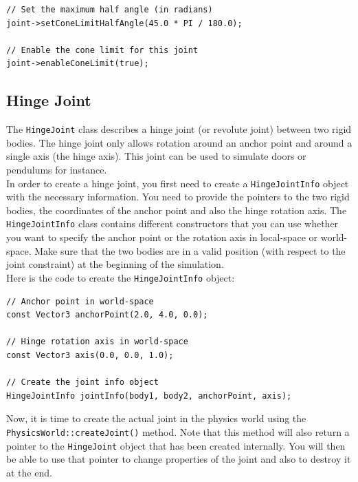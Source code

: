 \documentclass[a4paper,12pt]{article}
\begin{document}
    \begin{lstlisting}
// Set the maximum half angle (in radians) 
joint->setConeLimitHalfAngle(45.0 * PI / 180.0);

// Enable the cone limit for this joint
joint->enableConeLimit(true);
  \end{lstlisting}

    \subsection{Hinge Joint}

    The \texttt{HingeJoint} class describes a hinge joint (or revolute joint) between two rigid bodies. The hinge joint only allows rotation around an
    anchor point and around a single axis (the hinge axis). This joint can be used to simulate doors or pendulums for instance. \\

    In order to create a hinge joint, you first need to create a \texttt{HingeJointInfo} object with the necessary information. You need to provide
    the pointers to the two rigid bodies, the coordinates of the anchor point and also the hinge rotation axis. The \texttt{HingeJointInfo} class contains
    different constructors that you can use whether you want to specify the anchor point or the rotation axis in local-space or world-space.
    Make sure that the two bodies are in a valid position (with respect to the joint constraint) at the beginning of the simulation. \\

    Here is the code to create the \texttt{HingeJointInfo} object: \\

    \begin{lstlisting}
// Anchor point in world-space
const Vector3 anchorPoint(2.0, 4.0, 0.0);

// Hinge rotation axis in world-space
const Vector3 axis(0.0, 0.0, 1.0);

// Create the joint info object
HingeJointInfo jointInfo(body1, body2, anchorPoint, axis);
  \end{lstlisting}

    \vspace{0.6cm}

    \begin{sloppypar}
    Now, it is time to create the actual joint in the physics world using the \texttt{PhysicsWorld::createJoint()} method.
    Note that this method will also return a pointer to the \texttt{HingeJoint} object that has been created internally. You will then
    be able to use that pointer to change properties of the joint and also to destroy it at the end. \\
    \end{sloppypar}
\end{document}
